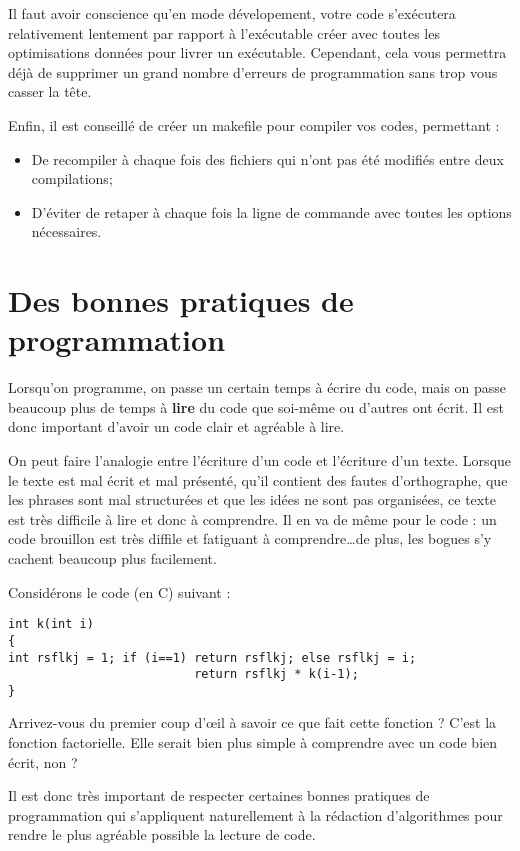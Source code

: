 Il faut avoir conscience qu'en mode dévelopement, votre code s'exécutera relativement lentement par rapport à l'exécutable créer avec toutes les optimisations données pour livrer un exécutable. Cependant, cela vous permettra déjà de supprimer un grand nombre
d'erreurs de programmation sans trop vous casser la tête.

Enfin, il est conseillé de créer un makefile pour compiler vos codes, permettant :
\begin{itemize}
  \item De recompiler à chaque fois des fichiers qui n'ont pas été modifiés entre deux compilations;
  \item D'éviter de retaper à chaque fois la ligne de commande avec toutes les options nécessaires.
\end{itemize}

\section{Des bonnes pratiques de programmation}

Lorsqu'on programme, on passe un certain temps à écrire du code, mais on passe beaucoup plus de temps à \textbf{lire}
du code que soi-même ou d'autres ont écrit. Il est donc important d'avoir un code clair et agréable à lire.

On peut faire l'analogie entre l'écriture d'un code et l'écriture d'un texte. Lorsque le texte est mal écrit et mal présenté, qu'il contient des fautes d'orthographe, que les phrases sont mal structurées et que les idées ne sont pas organisées, ce texte est très difficile à lire et donc à comprendre. Il en va de même pour le code : un code brouillon est très diffile et fatiguant à comprendre\ldots de plus, les bogues s'y cachent beaucoup plus facilement.

Considérons le code (en C) suivant :
\begin{lstlisting}
int k(int i)
{
int rsflkj = 1; if (i==1) return rsflkj; else rsflkj = i;
                          return rsflkj * k(i-1);
}
\end{lstlisting}

Arrivez-vous du premier coup d'{\oe}il à savoir ce que fait cette fonction ? C'est la fonction factorielle. Elle serait bien plus simple à comprendre avec un code bien écrit, non ?

Il est donc très important de respecter certaines bonnes pratiques de programmation qui s'appliquent naturellement à la
rédaction d'algorithmes pour rendre le plus agréable possible la lecture de code.


